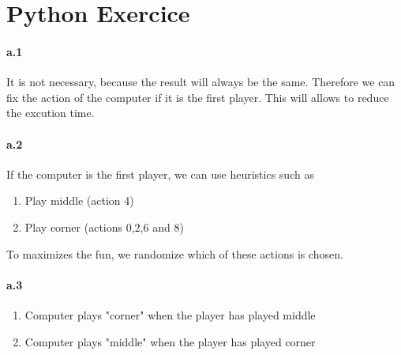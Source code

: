 \section{Python Exercice}
\label{2.3}

\paragraph{a.1}
It is not necessary, because the result will always be the same. Therefore we can fix the action of the computer if it is the first player. This will allows to reduce the excution time.
\paragraph{a.2}
If the computer is the first player, we can use heuristics such as
\begin{enumerate}
\item Play middle (action 4)
\item Play corner (actions 0,2,6 and 8)
\end{enumerate}
To maximizes the fun, we randomize which of these actions is chosen.
\paragraph{a.3}
\begin{enumerate}
\item Computer plays "corner" when the player has played middle
\item Computer plays "middle" when the player has played corner
\end{enumerate}


